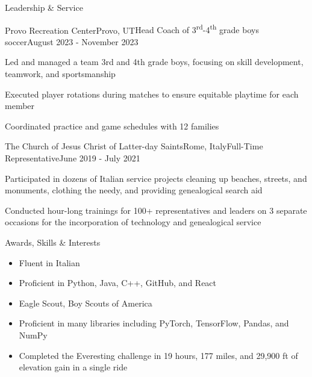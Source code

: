 \documentclass[
	10pt,
]{resume}
\begin{document}

\begin{rSection}{Leadership \& Service}

	\begin{rSubsection}{Provo Recreation Center}{Provo, UT}{Head Coach of 3\textsuperscript{rd}-4\textsuperscript{th} grade boys soccer}{August 2023 - November 2023}
		\item Led and managed a team 3rd and 4th grade boys, focusing on skill development, teamwork, and sportsmanship
		\item Executed player rotations during matches to ensure equitable playtime for each member
		\item Coordinated practice and game schedules with 12 families
	\end{rSubsection}


	\begin{rSubsection}{The Church of Jesus Christ of Latter-day Saints}{Rome, Italy}{Full-Time Representative}{June 2019 - July 2021}
		\item Participated in dozens of Italian service projects cleaning up beaches, streets, and monuments, clothing the needy,
		and providing genealogical search aid
		\item Conducted hour-long trainings for 100+ representatives and leaders on 3 separate occasions for the incorporation of
		technology and genealogical service
	\end{rSubsection}

\end{rSection}

\begin{rSection}{Awards, Skills \& Interests}
	\begin{multicols}{2} %
		\begin{itemize}
			\item Fluent in Italian
			\item Proficient in Python, Java, C++, GitHub, and React
			\item Eagle Scout, Boy Scouts of America
			\item Proficient in many libraries including PyTorch, TensorFlow, Pandas, and NumPy
			\item Completed the Everesting challenge in 19 hours, 177 miles, and 29,900 ft of elevation gain in a single ride
		\end{itemize}
	\end{multicols} %
\end{rSection}
\end{document}
